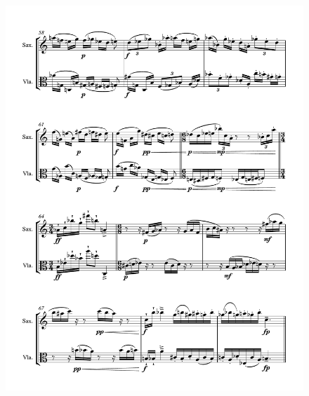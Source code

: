 \begin{figure}[htbp]
    \centering
	\includegraphics[width=6.5in]{figures/Sax_Viola_6.pdf}
\end{figure}

